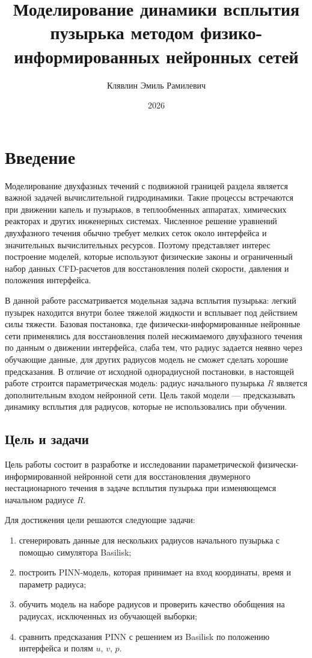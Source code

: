 \documentclass[12pt,a4paper]{article}
\title{Моделирование динамики всплытия пузырька методом физико-информированных нейронных сетей}
\author{Клявлин Эмиль Рамилевич}
\date{2026}
\begin{document}
\maketitle

\section{Введение}

Моделирование двухфазных течений с подвижной границей раздела является важной
задачей вычислительной гидродинамики. Такие процессы встречаются при движении
капель и пузырьков, в теплообменных аппаратах, химических реакторах и других
инженерных системах. Численное решение уравнений двухфазного течения обычно
требует мелких сеток около интерфейса и значительных вычислительных ресурсов.
Поэтому представляет интерес построение моделей, которые используют физические
законы и ограниченный набор данных CFD-расчетов для восстановления полей
скорости, давления и положения интерфейса.

В данной работе рассматривается модельная задача всплытия пузырька: легкий
пузырек находится внутри более тяжелой жидкости и всплывает под действием силы
тяжести. Базовая постановка, где физически-информированные нейронные сети применялись
для восстановления полей несжимаемого двухфазного течения по данным о движении
интерфейса, слаба тем, что радиус задается неявно через обучающие данные, для других радиусов модель не сможет сделать хорошие предсказания. В отличие от исходной однорадиусной постановки, в настоящей работе
строится параметрическая модель: радиус начального пузырька \(R\) является
дополнительным входом нейронной сети. Цель такой модели --- предсказывать
динамику всплытия для радиусов, которые не использовались при обучении.

\subsection{Цель и задачи}

Цель работы состоит в разработке и исследовании параметрической
физически-информированной нейронной сети для восстановления двумерного
нестационарного течения в задаче всплытия пузырька при изменяющемся начальном
радиусе \(R\).

Для достижения цели решаются следующие задачи:
\begin{enumerate}
    \item сгенерировать данные для нескольких радиусов начального пузырька
    с помощью симулятора Basilisk;
    \item построить PINN-модель, которая принимает на вход координаты, время и
    параметр радиуса;
    \item обучить модель на наборе радиусов и проверить качество обобщения на
    радиусах, исключенных из обучающей выборки;
    \item сравнить предсказания PINN с решением из Basilisk по положению интерфейса и
    полям \(u\), \(v\), \(p\).
\end{enumerate}
\end{document}
